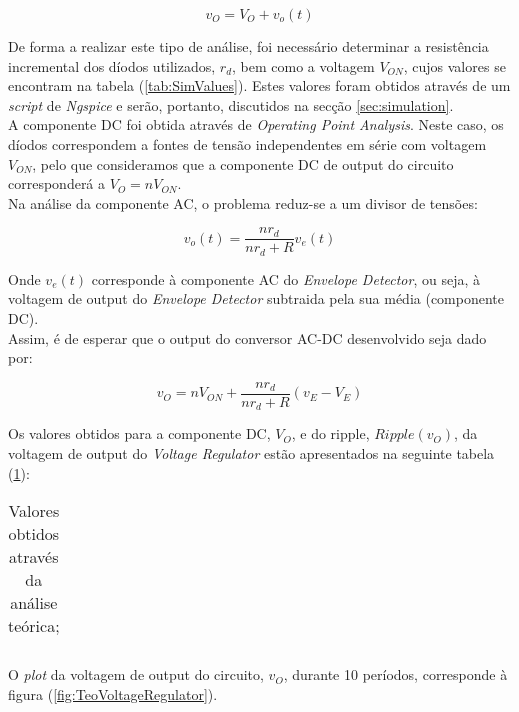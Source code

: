 \begin{equation}
    \label{eq:DCACAnalysis}
    v_O = V_O + v_o(t)
\end{equation}

De forma a realizar este tipo de análise, foi necessário determinar a resistência incremental dos díodos utilizados, $r_d$, bem 
como a voltagem $V_{ON}$, cujos valores se encontram na tabela (\ref{tab:SimValues}). Estes valores foram obtidos através de um
\emph{script} de \emph{Ngspice} e serão, portanto, discutidos na secção \ref{sec:simulation}.
\\
A componente DC foi obtida através de \emph{Operating Point Analysis}. Neste caso, os díodos correspondem a fontes de tensão
independentes em série com voltagem $V_{ON}$, pelo que consideramos que a componente DC de output do circuito corresponderá
a $V_O = n V_{ON}$.
\\
Na análise da componente AC, o problema reduz-se a um divisor de tensões:

\begin{equation}
    v_o(t) = \frac{n r_d}{n r_d + R} v_e(t)
\end{equation}

Onde $v_e(t)$ corresponde à componente AC do \emph{Envelope Detector}, ou seja, à voltagem de output do \emph{Envelope Detector}
subtraida pela sua média (componente DC).
\\
Assim, é de esperar que o output do conversor AC-DC desenvolvido seja dado por:

\begin{equation}
   v_O = n V_{ON} + \frac{n r_d}{n r_d + R} (v_E - V_E)
   \label{eq:OutputVoltageTeo}
\end{equation}

Os valores obtidos para a componente DC, $V_O$, e do ripple, $Ripple(v_O)$, da voltagem de output do \emph{Voltage Regulator} estão apresentados
na seguinte tabela (\ref{tab:TeoValues}):

\begin{table}[H]
    \centering
    \begin{tabular}{|l|r|}
    \hline
    
    \end{tabular}
    \caption{Valores obtidos através da análise teórica;}
    \label{tab:TeoValues}
  \end{table}

O \emph{plot} da voltagem de output do circuito, $v_O$, durante 10 períodos, corresponde à figura (\ref{fig:TeoVoltageRegulator}).

